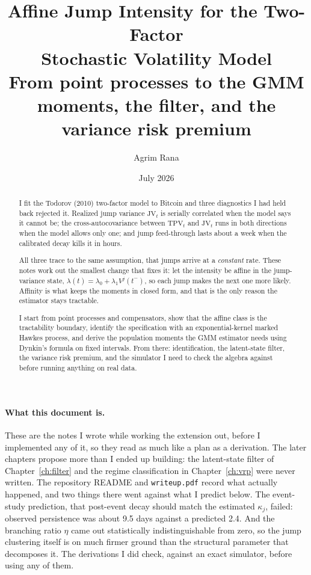 \documentclass[11pt]{report}
\title{\textbf{Affine Jump Intensity for the Two-Factor\\ Stochastic Volatility Model}\\[1ex]
\large From point processes to the GMM moments, the filter, and the\\
variance risk premium}
\author{Agrim Rana}
\date{July 2026}
\theoremstyle{definition}
\theoremstyle{remark}
\newcommand{\Vj}{V^{j}}
\newcommand{\TPV}{\mathrm{TPV}}
\newcommand{\JV}{\mathrm{JV}}
\begin{document}
\maketitle

\begin{abstract}
\noindent
I fit the Todorov (2010) two-factor model to Bitcoin and three diagnostics I had
held back rejected it. Realized jump variance $\JV_t$ is serially correlated
when the model says it cannot be; the cross-autocovariance between $\TPV_t$ and
$\JV_t$ runs in both directions when the model allows only one; and jump
feed-through lasts about a week when the calibrated decay kills it in hours.

All three trace to the same assumption, that jumps arrive at a \emph{constant}
rate. These notes work out the smallest change that fixes it: let the intensity
be affine in the jump-variance state, $\lambda(t)=\lambda_{0}+\lambda_{1}\Vj(t^{-})$,
so each jump makes the next one more likely. Affinity is what keeps the moments
in closed form, and that is the only reason the estimator stays tractable.

I start from point processes and compensators, show that the affine class is the
tractability boundary, identify the specification with an exponential-kernel
marked Hawkes process, and derive the population moments the GMM estimator needs
using Dynkin's formula on fixed intervals. From there: identification, the
latent-state filter, the variance risk premium, and the simulator I need to
check the algebra against before running anything on real data.
\end{abstract}

\paragraph{What this document is.} These are the notes I wrote while working the
extension out, before I implemented any of it, so they read as much like a plan as a
derivation. The later chapters propose more than I ended up building: the latent-state
filter of Chapter~\ref{ch:filter} and the regime classification in Chapter~\ref{ch:vrp}
were never written. The repository README and \texttt{writeup.pdf} record what actually
happened, and two things there went against what I predict below. The event-study
prediction, that post-event decay should match the estimated $\kappa_{j}$, failed:
observed persistence was about 9.5 days against a predicted 2.4. And the branching ratio
$\eta$ came out statistically indistinguishable from zero, so the jump clustering itself
is on much firmer ground than the structural parameter that decomposes it. The
derivations I did check, against an exact simulator, before using any of them.
\end{document}
